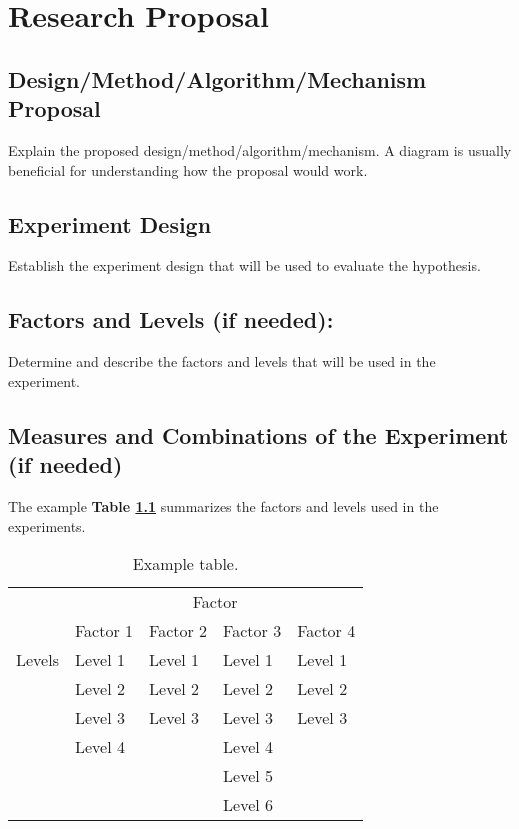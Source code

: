 \chapter{Research Proposal}
\label{chapter:research-proposal}

\section{Design/Method/Algorithm/Mechanism Proposal}

Explain the proposed design/method/algorithm/mechanism. A diagram is usually beneficial for understanding how the proposal would work.
 
\section{Experiment Design}
\label{section:experiment-design}
Establish the experiment design that will be used to evaluate the hypothesis.
\section{Factors and Levels (if needed):}
Determine and describe the factors and levels that will be used in the experiment.

\section{Measures and Combinations of the Experiment (if needed)}

The example \textbf{Table \ref{tab:table}} summarizes the factors and levels used in the experiments.
\begin{table}[h]
	\caption{Example table.}
	\label{tab:table}
	\begin{center}
		\begin{tabular}{|l|l|l|l|l|}
			\cline{2-5}
			\multicolumn{1}{c|}{}	& \multicolumn{4}{c|}{Factor} \\ 
			\cline{2-5}
			\multicolumn{1}{c|}{}	& Factor 1 & Factor 2 & Factor 3 & Factor 4 \\ \hline
			Levels
			& Level 1 & Level 1	& Level 1  & Level 1   \\
			& Level 2 & Level 2  & Level 2 & Level 2 \\
			& Level 3 & Level 3 & Level 3 & Level 3 \\
			& Level 4 &    & Level 4  &   \\ 
			&  &    & Level 5  &   \\ 
			&  &    & Level 6  &     \\\hline
		\end{tabular}
	\end{center}
\end{table}

